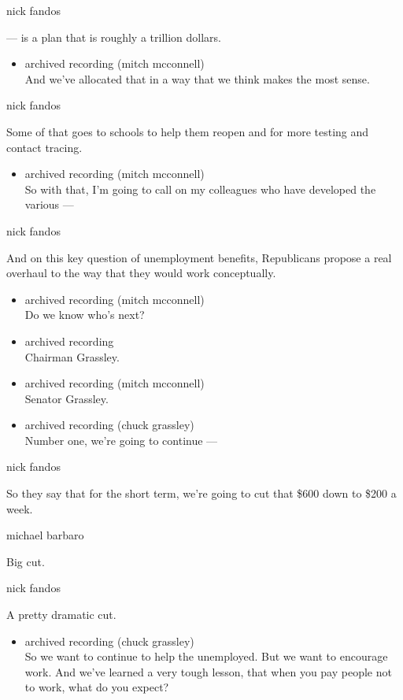 nick fandos

--- is a plan that is roughly a trillion dollars.

\begin{itemize}
\tightlist
\item
  archived recording (mitch mcconnell)\\
  And we've allocated that in a way that we think makes the most sense.
\end{itemize}

nick fandos

Some of that goes to schools to help them reopen and for more testing
and contact tracing.

\begin{itemize}
\tightlist
\item
  archived recording (mitch mcconnell)\\
  So with that, I'm going to call on my colleagues who have developed
  the various ---
\end{itemize}

nick fandos

And on this key question of unemployment benefits, Republicans propose a
real overhaul to the way that they would work conceptually.

\begin{itemize}
\item
  archived recording (mitch mcconnell)\\
  Do we know who's next?
\item
  archived recording\\
  Chairman Grassley.
\item
  archived recording (mitch mcconnell)\\
  Senator Grassley.
\item
  archived recording (chuck grassley)\\
  Number one, we're going to continue ---
\end{itemize}

nick fandos

So they say that for the short term, we're going to cut that \$600 down
to \$200 a week.

michael barbaro

Big cut.

nick fandos

A pretty dramatic cut.

\begin{itemize}
\tightlist
\item
  archived recording (chuck grassley)\\
  So we want to continue to help the unemployed. But we want to
  encourage work. And we've learned a very tough lesson, that when you
  pay people not to work, what do you expect?
\end{itemize}


